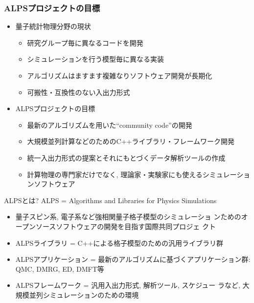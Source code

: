 \begin{frame}
  \frametitle{ALPSプロジェクトの目標}
  \begin{itemize}
    \setlength{\itemsep}{1em}
  \item 量子統計物理分野の現状
    \begin{itemize}
    \item 研究グループ毎に異なるコードを開発
    \item シミュレーションを行う模型毎に異なる実装
    \item アルゴリズムはますます複雑なりソフトウェア開発が長期化
    \item 可搬性・互換性のない入出力形式
    \end{itemize}
  \item ALPSプロジェクトの目標
    \begin{itemize}
    \item 最新のアルゴリズムを用いた``community code''の開発
    \item 大規模並列計算などのためのC++ライブラリ・フレームワーク開発
    \item 統一入出力形式の提案とそれにもとづくデータ解析ツールの作成
    \item 計算物理の専門家だけでなく, 理論家・実験家にも使えるシミュレーションソフトウェア
    \end{itemize}
  \end{itemize}
\end{frame}

\begin{frame}{ALPSとは?}
  ALPS = \alert{A}lgorithms and \alert{L}ibraries for \alert{P}hysics \alert{S}imulations
      \begin{itemize}
      \item 量子スピン系, 電子系など強相関量子格子模型のシミュレーショ
        ンためのオープンソースソフトウェアの開発を目指す国際共同プロジェ
        クト
        \item ALPSライブラリ = C++による格子模型のための汎用ライブラリ群
        \item ALPSアプリケーション = 最新のアルゴリズムに基づくアプリケーション群: QMC, DMRG, ED, DMFT等
        \item ALPSフレームワーク = 汎用入出力形式, 解析ツール, スケジュー
          ラなど, 大規模並列シミュレーションのための環境
      \end{itemize}
\end{frame}

